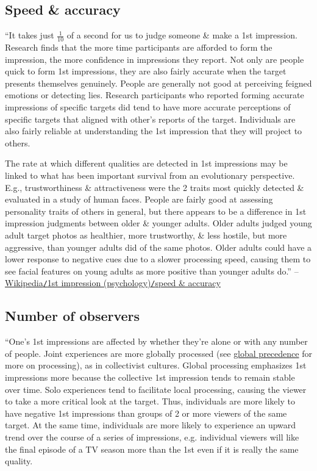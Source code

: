 \documentclass[oneside]{book}
\numberwithin{equation}{section}
\begin{document}
\subsection{Speed \& accuracy}
``It takes just $\frac{1}{10}$ of a second for us to judge someone \& make a 1st impression. Research finds that the more time participants are afforded to form the impression, the more confidence in impressions they report. Not only are people quick to form 1st impressions, they are also fairly accurate when the target presents themselves genuinely. People are generally not good at perceiving feigned emotions or detecting lies. Research participants who reported forming accurate impressions of specific targets did tend to have more accurate perceptions of specific targets that aligned with other's reports of the target. Individuals are also fairly reliable at understanding the 1st impression that they will project to others.

The rate at which different qualities are detected in 1st impressions may be linked to what has been important survival from an evolutionary perspective. E.g., trustworthiness \& attractiveness were the 2 traits most quickly detected \& evaluated in a study of human faces. People are fairly good at assessing personality traits of others in general, but there appears to be a difference in 1st impression judgments between older \& younger adults. Older adults judged young adult target photos as healthier, more trustworthy, \& less hostile, but more aggressive, than younger adults did of the same photos. Older adults could have a lower response to negative cues due to a slower processing speed, causing them to see facial features on young adults as more positive than younger adults do.'' -- \href{https://en.wikipedia.org/wiki/First_impression_(psychology)#Speed_and_accuracy}{Wikipedia\texttt{/}1st impression (psychology)\texttt{/}speed \& accuracy}

\subsection{Number of observers}
``One's 1st impressions are affected by whether they're alone or with any number of people. Joint experiences are more globally processed (see \href{https://en.wikipedia.org/wiki/Global_precedence}{global precedence} for more on processing), as in collectivist cultures. Global processing emphasizes 1st impressions more because the collective 1st impression tends to remain stable over time. Solo experiences tend to facilitate local processing, causing the viewer to take a more critical look at the target. Thus, individuals are more likely to have negative 1st impressions than groups of 2 or more viewers of the same target. At the same time, individuals are more likely to experience an upward trend over the course of a series of impressions, e.g. individual viewers will like the final episode of a TV season more than the 1st even if it is really the same quality.
\end{document}
